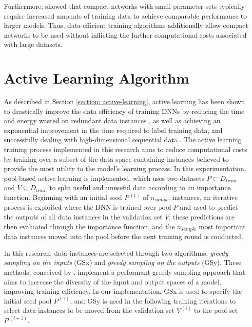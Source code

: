 \documentclass[a4paper, 11pt]{report}
\begin{document}
    Furthermore, \citet{bender-2021} showed that compact networks with small parameter sets typically require increased amounts of training data to achieve comparable performance to larger models. Thus, data-efficient training algorithms additionally allow compact networks to be used without inflicting the further computational costs associated with large datasets.


    \section{Active Learning Algorithm}
    \label{section: al-model}

    As described in Section \ref{section: active-learning}, active learning has been shown to drastically improve the data efficiency of training DNNs by reducing the time and energy wasted on redundant data instances \citep{xu-2021}, as well as achieving an exponential improvement in the time required to label training data, and successfully dealing with high-dimensional sequential data \citep{ren-2021}. The active learning training process implemented in this research aims to reduce computational costs by training over a subset of the data space containing instances believed to provide the most utility to the model's learning process. In this experimentation, pool-based active learning is implemented, which uses two datasets $P \subset D_{train}$ and $V \subseteq D_{train}$ to split useful and unuseful data according to an importance function. Beginning with an initial seed $P^{\,(1)}$ of $n_{sample}$ instances, an iterative process is exploited where the DNN is trained over pool $P$ and used to predict the outputs of all data instances in the validation set $V$; these predictions are then evaluated through the importance function, and the $n_{sample}$ most important data instances moved into the pool before the next training round is conducted.

    In this research, data instances are selected through two algorithms: \emph{greedy sampling on the inputs} (GSx) and \emph{greedy sampling on the outputs} (GSy). These methods, conceived by \citet{wu-2019}, implement a performant greedy sampling approach that aims to increase the diversity of the input and output spaces of a model, improving training efficiency. In our implementation, GSx is used to specify the initial seed pool $P^{\,(1)}$, and GSy is used in the following training iterations to select data instances to be moved from the validation set $V^{\,(i)}$ to the pool set $P^{\,(i+1)}$. 
\end{document}
